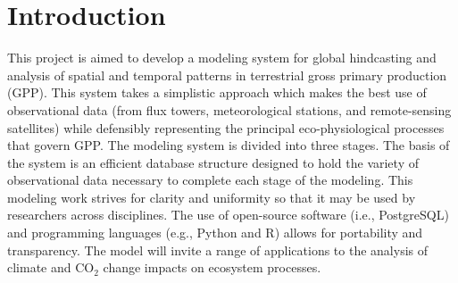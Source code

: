 %
%
%
%
%
\section{Introduction}
\label{sec:intro}
This project is aimed to develop a modeling system for global hindcasting and analysis of spatial and temporal patterns in terrestrial gross primary production (GPP).  
This system takes a simplistic approach which makes the best use of observational data (from flux towers, meteorological stations, and remote-sensing satellites) while defensibly representing the principal eco-physiological processes that govern GPP.  
The modeling system is divided into three stages.  
The basis of the system is an efficient database structure designed to hold the variety of observational data necessary to complete each stage of the modeling.  
This modeling work strives for clarity and uniformity so that it may be used by researchers across disciplines.  
The use of open-source software (i.e., PostgreSQL) and programming languages (e.g., Python and R) allows for portability and transparency.  
The model will invite a range of applications to the analysis of climate and CO$_{2}$ change impacts on ecosystem processes.
